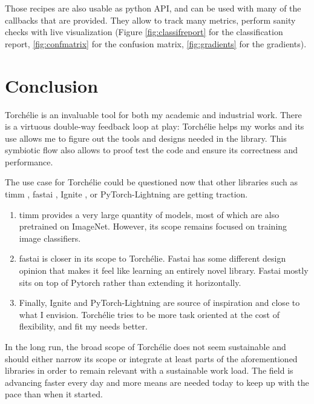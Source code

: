 Those recipes are also usable as python API, and can be used with many of the callbacks that are provided. They allow to track many metrics, perform sanity checks with live visualization (Figure \ref{fig:classifreport} for the classification report, \ref{fig:confmatrix} for the confusion matrix, \ref{fig:gradients} for the gradients).

\section{Conclusion}


Torchélie is an invaluable tool for both my academic and industrial work. There is a virtuous double-way feedback loop at play: Torchélie helps my works and its use allows me to figure out the tools and designs needed in the library. This symbiotic flow also allows to proof test the code and ensure its correctness and performance.

The use case for Torchélie could be questioned now that other libraries such as timm \cite{timm}, fastai \cite{fastai}, Ignite \cite{ignite}, or PyTorch-Lightning are getting traction.

\begin{enumerate}
    \item timm provides a very large quantity of models, most of which are also pretrained on ImageNet. However, its scope remains focused on training image classifiers.
    \item fastai is closer in its scope to Torchélie. Fastai has some different design opinion that makes it feel like learning an entirely novel library. Fastai mostly sits on top of Pytorch rather than extending it horizontally.
    \item Finally, Ignite and PyTorch-Lightning are source of inspiration and close to what I envision. Torchélie tries to be more task oriented at the cost of flexibility, and fit my needs better.
\end{enumerate}

In the long run, the broad scope of Torchélie does not seem sustainable and should either narrow its scope or integrate at least parts of the aforementioned libraries in order to remain relevant with a sustainable work load. The field is advancing faster every day and more means are needed today to keep up with the pace than when it started.

